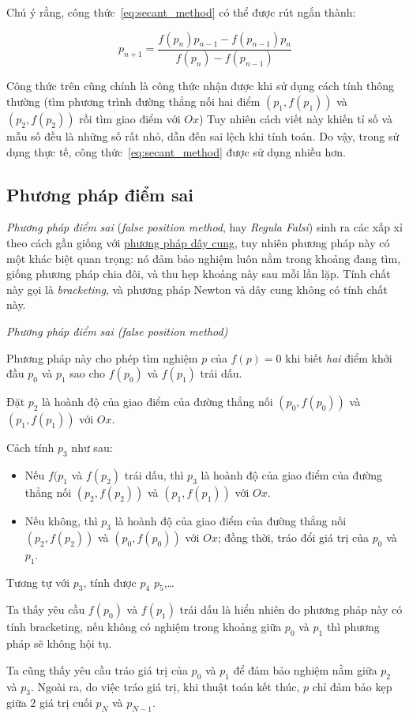 \documentclass[../../Lectures]{subfiles}
\begin{document}
Chú ý rằng, công thức~\ref{eq:secant_method} có thể được rút ngắn thành:

\[p_{n + 1} = \frac{f(p_n) p_{n - 1} - f(p_{n - 1}) p_n}{f(p_n) - f(p_{n - 1})}\]

Công thức trên cũng chính là công thức nhận được khi sử dụng cách tính thông
thường (tìm phương trình đường thẳng nối hai điểm \((p_1, f(p_1))\) và \((p_2,
f(p_2))\) rồi tìm giao điểm với \(Ox\)) Tuy nhiên cách viết này khiến tỉ số và
mẫu số đều là những số rất nhỏ, dẫn đến sai lệch khi tính toán. Do vậy, trong sử
dụng thực tế, công thức~\ref{eq:secant_method} được sử dụng nhiều hơn.

\subsection{Phương pháp điểm sai}

\emph{Phương pháp điểm sai} (\emph{false position method}, hay \emph{Regula
Falsi}) sinh ra các xấp xỉ theo cách gần giống với
\hyperref[method:secant]{phương pháp dây cung}, tuy nhiên phương pháp này có một
khác biệt quan trọng: nó đảm bảo nghiệm luôn nằm trong khoảng đang tìm, giống
phương pháp chia đôi, và thu hẹp khoảng này sau mỗi lần lặp. Tính chất này gọi
là \emph{bracketing}, và phương pháp Newton và dây cung không có tính chất này.

\begin{method}
    \emph{Phương pháp điểm sai (false position method)}

    Phương pháp này cho phép tìm nghiệm \(p\) của \(f(p) = 0\) khi biết
    \emph{hai} điểm khởi đầu \(p_0\) và \(p_1\) sao cho \(f(p_0)\) và \(f(p_1)\)
    trái dấu.

    Đặt \(p_2\) là hoành độ của giao điểm của đường thẳng nối \((p_0, f(p_0))\)
    và \((p_1, f(p_1))\) với \(Ox\).

    Cách tính \(p_3\) như sau:

    \begin{itemize}
        \item Nếu \(f(p_1\) và \(f(p_2)\) trái dấu, thì \(p_3\) là hoành độ của
            giao điểm của đường thẳng nối \((p_2, f(p_2))\) và \((p_1, f(p_1))\)
            với \(Ox\).
        \item Nếu không, thì \(p_3\) là hoành độ của giao điểm của đường thẳng
            nối \((p_2, f(p_2))\) và \((p_0, f(p_0))\)  với \(Ox\); đồng thời,
            tráo đổi giá trị của \(p_0\) và \(p_1\).
    \end{itemize}

    Tương tự với \(p_3\), tính được \(p_4\) \(p_5\),\ldots
\end{method}

Ta thấy yêu cầu \(f(p_0)\) và \(f(p_1)\) trái dấu là hiển nhiên do phương pháp
này có tính bracketing, nếu không có nghiệm trong khoảng giữa \(p_0\) và \(p_1\)
thì phương pháp sẽ không hội tụ.

Ta cũng thấy yêu cầu tráo giá trị của \(p_0\) và \(p_1\) để đảm bảo nghiệm nằm
giữa \(p_2\) và \(p_3\). Ngoài ra, do việc tráo giá trị, khi thuật toán kết
thúc, \(p\) chỉ đảm bảo kẹp giữa 2 giá trị cuối \(p_N\) và \(p_{N - 1}\).
\end{document}
